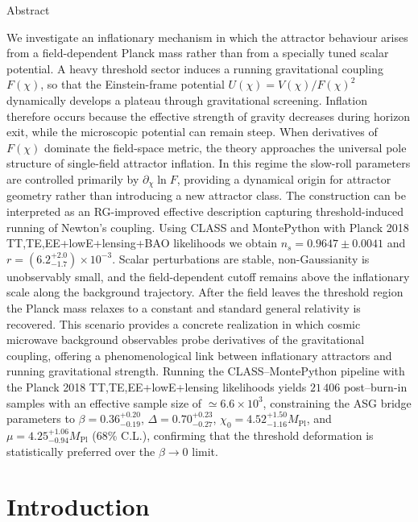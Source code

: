 \documentclass[
]{article}
\author{}
\date{}
\begin{document}
Abstract

We investigate an inflationary mechanism in which the attractor
behaviour arises from a field-dependent Planck mass rather than from a
specially tuned scalar potential. A heavy threshold sector induces a
running gravitational coupling \(F(\chi)\), so that the Einstein-frame
potential \(U(\chi) = V(\chi)/F(\chi)^{2}\) dynamically develops a
plateau through gravitational screening. Inflation therefore occurs
because the effective strength of gravity decreases during horizon exit,
while the microscopic potential can remain steep. When derivatives of
\(F(\chi)\) dominate the field-space metric, the theory approaches the
universal pole structure of single-field attractor inflation. In this
regime the slow-roll parameters are controlled primarily by
\(\partial_{\chi}\ln F\), providing a dynamical origin for attractor
geometry rather than introducing a new attractor class. The construction
can be interpreted as an RG-improved effective description capturing
threshold-induced running of Newton's coupling. Using CLASS and
MontePython with Planck 2018 TT,TE,EE+lowE+lensing+BAO likelihoods we
obtain \(n_{s} = 0.9647 \pm 0.0041\) and
\(r = ({6.2}_{- 1.7}^{+ 2.0}) \times 10^{- 3}\). Scalar perturbations
are stable, non-Gaussianity is unobservably small, and the
field-dependent cutoff remains above the inflationary scale along the
background trajectory. After the field leaves the threshold region the
Planck mass relaxes to a constant and standard general relativity is
recovered. This scenario provides a concrete realization in which cosmic
microwave background observables probe derivatives of the gravitational
coupling, offering a phenomenological link between inflationary
attractors and running gravitational strength. Running the
CLASS--MontePython pipeline with the Planck 2018 TT,TE,EE+lowE+lensing
likelihoods yields \(21\,406\) post--burn-in samples with an effective
sample size of \(\simeq 6.6\times 10^{3}\), constraining the ASG bridge
parameters to \(\beta = 0.36^{+0.20}_{-0.19}\),
\(\Delta = 0.70^{+0.23}_{-0.27}\),
\(\chi_{0} = 4.52^{+1.50}_{-1.16}M_{\mathrm{Pl}}\), and
\(\mu = 4.25^{+1.06}_{-0.94}M_{\mathrm{Pl}}\) (68\% C.L.), confirming
that the threshold deformation is statistically preferred over the
\(\beta \to 0\) limit.

\section{Introduction}\label{introduction}
\end{document}
